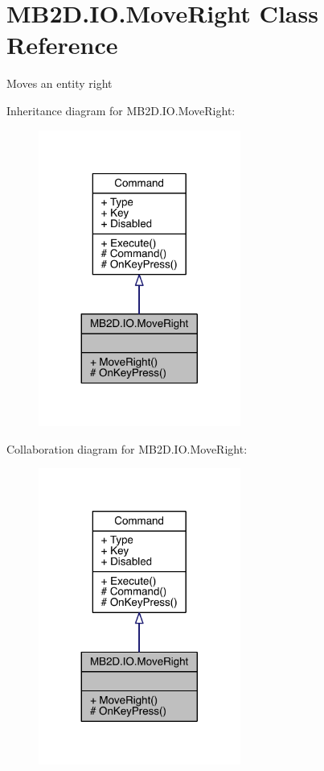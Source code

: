 \hypertarget{class_m_b2_d_1_1_i_o_1_1_move_right}{}\section{M\+B2\+D.\+I\+O.\+Move\+Right Class Reference}
\label{class_m_b2_d_1_1_i_o_1_1_move_right}


Moves an entity right  




Inheritance diagram for M\+B2\+D.\+I\+O.\+Move\+Right\+:\nopagebreak
\begin{figure}[H]
\begin{center}
\leavevmode
\includegraphics[width=188pt]{class_m_b2_d_1_1_i_o_1_1_move_right__inherit__graph}
\end{center}
\end{figure}


Collaboration diagram for M\+B2\+D.\+I\+O.\+Move\+Right\+:\nopagebreak
\begin{figure}[H]
\begin{center}
\leavevmode
\includegraphics[width=188pt]{class_m_b2_d_1_1_i_o_1_1_move_right__coll__graph}
\end{center}
\end{figure}
